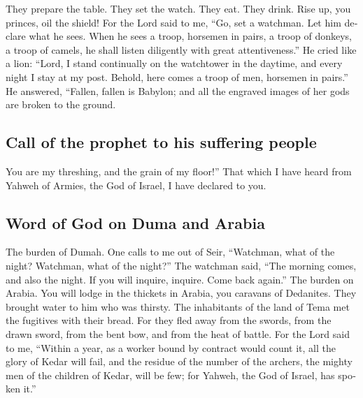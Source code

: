 \begin{paracol}{2}
\begin{otherlanguage}{english}
 They prepare the table. They set the watch. They eat.
They drink. Rise up, you princes, oil the shield!  For the
Lord said to me, ``Go, set a watchman. Let him declare what he sees.
 When he sees a troop, horsemen in pairs, a troop of
donkeys, a troop of camels, he shall listen diligently with great
attentiveness.''  He cried like a lion: ``Lord, I stand
continually on the watchtower in the daytime, and every night I stay at
my post.  Behold, here comes a troop of men, horsemen in
pairs.'' He answered, ``Fallen, fallen is Babylon; and all the engraved
images of her gods are broken to the ground.

\hypertarget{call-of-the-prophet-to-his-suffering-people}{%
\subsection{Call of the prophet to his suffering
people}\label{call-of-the-prophet-to-his-suffering-people}}

 You are my threshing, and the grain of my floor!'' That
which I have heard from Yahweh of Armies, the God of Israel, I have
declared to you.

\hypertarget{word-of-god-on-duma-and-arabia}{%
\subsection{Word of God on Duma and
Arabia}\label{word-of-god-on-duma-and-arabia}}

 The burden of Dumah. One calls to me out of Seir,
``Watchman, what of the night? Watchman, what of the night?''
 The watchman said, ``The morning comes, and also the
night. If you will inquire, inquire. Come back again.'' 
The burden on Arabia. You will lodge in the thickets in Arabia, you
caravans of Dedanites.  They brought water to him who was
thirsty. The inhabitants of the land of Tema met the fugitives with
their bread.  For they fled away from the swords, from
the drawn sword, from the bent bow, and from the heat of battle.
 For the Lord said to me, ``Within a year, as a worker
bound by contract would count it, all the glory of Kedar will fail,
 and the residue of the number of the archers, the mighty
men of the children of Kedar, will be few; for Yahweh, the God of
Israel, has spoken it.''

\end{otherlanguage}


\end{paracol}

